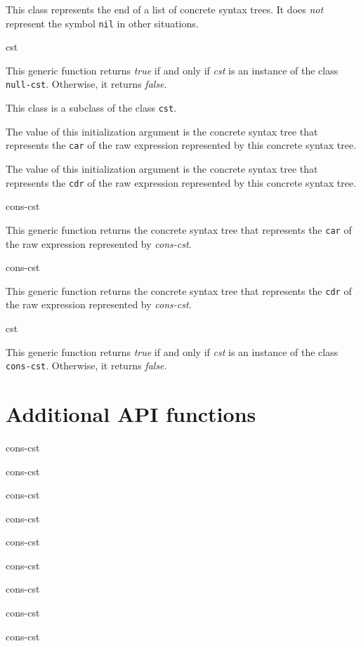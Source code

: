 
This class represents the end of a list of concrete syntax trees.  It
does \emph{not} represent the \commonlisp{} symbol \texttt{nil} in
other situations.

 {cst}

This generic function returns \emph{true} if and only if \textit{cst}
is an instance of the class \texttt{null-cst}.  Otherwise, it returns
\emph{false}.


This class is a subclass of the class \texttt{cst}.


The value of this initialization argument is the concrete syntax tree
that represents the \texttt{car} of the raw \commonlisp{} expression
represented by this concrete syntax tree.


The value of this initialization argument is the concrete syntax tree
that represents the \texttt{cdr} of the raw \commonlisp{} expression
represented by this concrete syntax tree.

 {cons-cst}

This generic function returns the concrete syntax tree that represents
the \texttt{car} of the raw \commonlisp{} expression represented by
\textit{cons-cst}.

 {cons-cst}

This generic function returns the concrete syntax tree that represents
the \texttt{cdr} of the raw \commonlisp{} expression represented by
\textit{cons-cst}.

 {cst}

This generic function returns \emph{true} if and only if \textit{cst}
is an instance of the class \texttt{cons-cst}.  Otherwise, it returns
\emph{false}.

\section{Additional API functions}

 {cons-cst}

 {cons-cst}

 {cons-cst}

 {cons-cst}

 {cons-cst}

 {cons-cst}

 {cons-cst}

 {cons-cst}

 {cons-cst}
